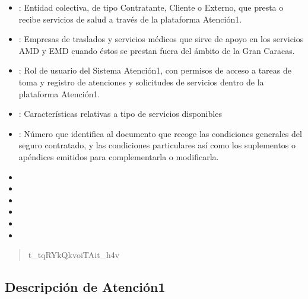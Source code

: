 \documentclass[letterpaper,10pt,spanish]{sphinxmanual}
\begin{document}
\begin{itemize}
\item {} 
: Entidad colectiva, de tipo Contratante, Cliente o Externo, que presta o recibe servicios de salud a través de la plataforma Atención\sphinxhyphen{}1.

\item {} 
: Empresas de traslados y servicios médicos que sirve de apoyo en los servicios AMD y EMD cuando éstos se prestan fuera del ámbito de la Gran Caracas.

\item {} 
: Rol de usuario del Sistema Atención\sphinxhyphen{}1, con permisos de acceso a tareas de toma y registro de atenciones y solicitudes de servicios dentro de la plataforma Atención\sphinxhyphen{}1.

\item {} 
: Características relativas a tipo de servicios disponibles

\item {} 
: Número que identifica al documento que recoge las condiciones generales del seguro contratado, y las condiciones particulares así como los suplementos o apéndices emitidos para complementarla o modificarla.

\item {} 

\item {} 

\item {} 

\item {} 

\item {} 

\item {} 

\end{itemize}
\begin{quote}

t\_tqRYkQkvoiTAit\_h4v
\end{quote}


\subsection{Descripción de Atención\sphinxhyphen{}1}
\label{\detokenize{descripcion_software:descripcion-de-atencion-1}}\label{\detokenize{descripcion_software::doc}}
\end{document}
